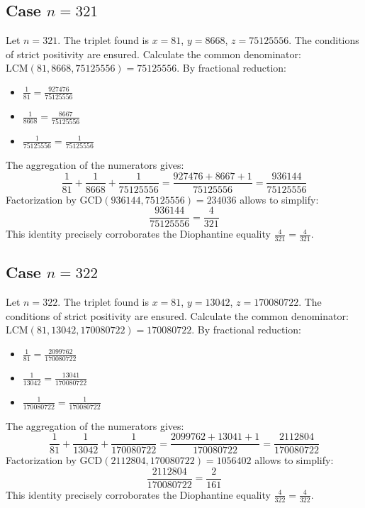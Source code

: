 \documentclass[11pt,a4paper]{article}
\begin{document}
\subsection{Case $n = 321$}
Let $n = 321$. The triplet found is $x = 81$, $y = 8668$, $z = 75125556$.
The conditions of strict positivity are ensured.
Calculate the common denominator: $\text{LCM}(81, 8668, 75125556) = 75125556$.
By fractional reduction:
\begin{itemize}
    \item $\frac{1}{81} = \frac{927476}{75125556}$
    \item $\frac{1}{8668} = \frac{8667}{75125556}$
    \item $\frac{1}{75125556} = \frac{1}{75125556}$
\end{itemize}
The aggregation of the numerators gives:
$$ \frac{1}{81} + \frac{1}{8668} + \frac{1}{75125556} = \frac{927476 + 8667 + 1}{75125556} = \frac{936144}{75125556} $$
Factorization by $\text{GCD}(936144, 75125556) = 234036$ allows to simplify:
$$ \frac{936144}{75125556} = \frac{4}{321} $$
This identity precisely corroborates the Diophantine equality $\frac{4}{321} = \frac{4}{321}$.

\subsection{Case $n = 322$}
Let $n = 322$. The triplet found is $x = 81$, $y = 13042$, $z = 170080722$.
The conditions of strict positivity are ensured.
Calculate the common denominator: $\text{LCM}(81, 13042, 170080722) = 170080722$.
By fractional reduction:
\begin{itemize}
    \item $\frac{1}{81} = \frac{2099762}{170080722}$
    \item $\frac{1}{13042} = \frac{13041}{170080722}$
    \item $\frac{1}{170080722} = \frac{1}{170080722}$
\end{itemize}
The aggregation of the numerators gives:
$$ \frac{1}{81} + \frac{1}{13042} + \frac{1}{170080722} = \frac{2099762 + 13041 + 1}{170080722} = \frac{2112804}{170080722} $$
Factorization by $\text{GCD}(2112804, 170080722) = 1056402$ allows to simplify:
$$ \frac{2112804}{170080722} = \frac{2}{161} $$
This identity precisely corroborates the Diophantine equality $\frac{4}{322} = \frac{4}{322}$.
\end{document}
